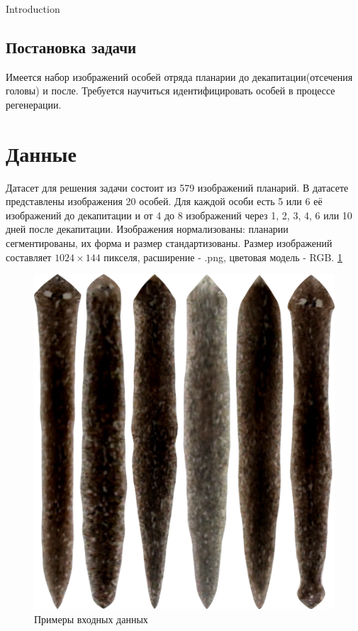 \documentclass{article}
\begin{document}
\begin{section}{Introduction}
\section{Постановка задачи}
Имеется набор изображений особей отряда планарии до декапитации(отсечения головы) и после.
Требуется научиться идентифицировать особей в процессе регенерации.

\end{section}

\section{Данные}
Датасет для решения задачи состоит из 579 изображений планарий. В датасете представлены изображения 20 особей. Для каждой особи есть 5 или 6 её изображений до декапитации и от 4 до 8 изображений через 1, 2, 3, 4, 6 или 10 дней после декапитации. Изображения нормализованы: планарии сегментированы, их форма и размер стандартизованы. Размер изображений составляет $1024 \times 144$ пикселя, расширение - .png, цветовая модель - RGB. \ref{fig:fig1}

\begin{figure}[H!]
\centering
\includegraphics[scale=0.4]{examples.png}
\centering
\caption{Примеры входных данных}
\label{fig:fig1}
\end{figure}
\end{document}
